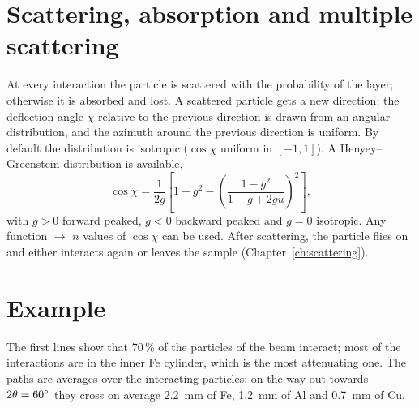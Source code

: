 \section{Scattering, absorption and multiple scattering}

At every interaction the particle is scattered with the probability  of the layer; otherwise it is
absorbed and lost. A scattered particle gets a new direction: the deflection angle $\chi$ relative to the previous direction
is drawn from an angular distribution, and the azimuth around the previous direction is uniform. By default
the distribution is isotropic ($\cos\chi$ uniform in $[-1,1]$). A Henyey--Greenstein distribution \cite{hg} is available,
\begin{equation}
  \cos\chi=\frac{1}{2g}\left[1+g^2-\left(\frac{1-g^2}{1-g+2gu}\right)^{2}\right],
\end{equation}
with $g>0$ forward peaked, $g<0$ backward peaked and $g=0$ isotropic. Any function  $\to$ $n$ values of $\cos\chi$
can be used. After scattering, the particle flies on and either interacts again or leaves the sample
(Chapter~\ref{ch:scattering}).

\section{Example}


The first lines show that 70\,\% of the particles of the beam interact; most of the interactions are in the inner Fe cylinder, which is the most
attenuating one. The paths are averages over the interacting particles: on the way out towards $2\theta=60^\circ$ they cross
on average 2.2~mm of Fe, 1.2~mm of Al and 0.7~mm of Cu.
